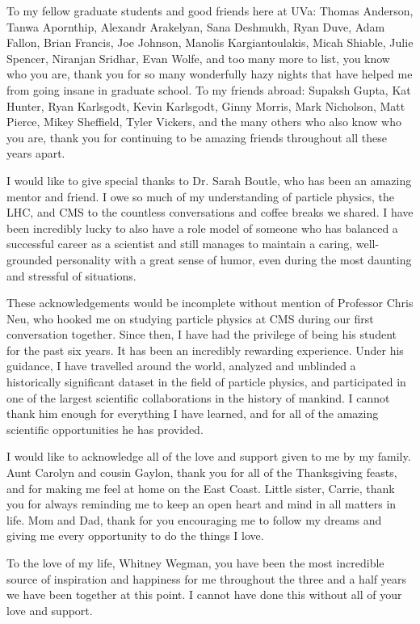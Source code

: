 \par To my fellow graduate students and good friends here at UVa:
Thomas Anderson, Tanwa Apornthip, Alexandr Arakelyan, Sana Deshmukh,
Ryan Duve, Adam Fallon, Brian Francis, Joe Johnson, Manolis
Kargiantoulakis, Micah Shiable, Julie Spencer, Niranjan Sridhar, Evan
Wolfe, and too many more to list, you know who you are, thank you for
so many wonderfully hazy nights that have helped me from going insane
in graduate school. To my friends abroad: Supaksh Gupta, Kat Hunter,
Ryan Karlsgodt, Kevin Karlsgodt, Ginny Morris, Mark Nicholson, Matt
Pierce, Mikey Sheffield, Tyler Vickers, and the many others who also
know who you are, thank you for continuing to be amazing friends
throughout all these years apart.  

\par  I would like to give special thanks to Dr. Sarah Boutle, who has
been an amazing mentor and friend.   I owe so much of my understanding
of particle physics, the LHC, and CMS to the countless conversations
and coffee breaks we shared.  I have been incredibly lucky to also
have a role model of someone who has balanced a successful career as
a scientist and still manages to maintain a caring, well-grounded
personality with a great sense of humor, even during the most daunting
and stressful of situations.    

\par These acknowledgements would be incomplete without mention of
Professor Chris Neu, who hooked me on studying particle physics at CMS
during our first conversation together.  Since then, I have had the
privilege of being his student for the past six years.  It has been
an incredibly rewarding experience.  Under his guidance, I have
travelled around the world, analyzed and unblinded a
historically significant dataset in the field of particle physics, and
participated in one of the largest scientific collaborations in the
history of mankind.  I cannot thank him enough for everything I have
learned, and for all of the amazing scientific opportunities he has
provided.

\par I would like to acknowledge all of the love and support given to
me by my family.  Aunt Carolyn and cousin Gaylon, thank you for all of
the Thanksgiving feasts, and for making me feel at home on the East
Coast.  Little sister, Carrie, thank you for always reminding me to
keep an open heart and mind in all matters in life.  Mom and Dad,
thank for you encouraging me to follow my dreams and giving me every
opportunity to do the things I love.     

\par To the love of my life, Whitney Wegman, you have been the most
incredible source of inspiration and happiness for me throughout the
three and a half years we have been together at this point.  I cannot
have done this without all of your love and support.  
